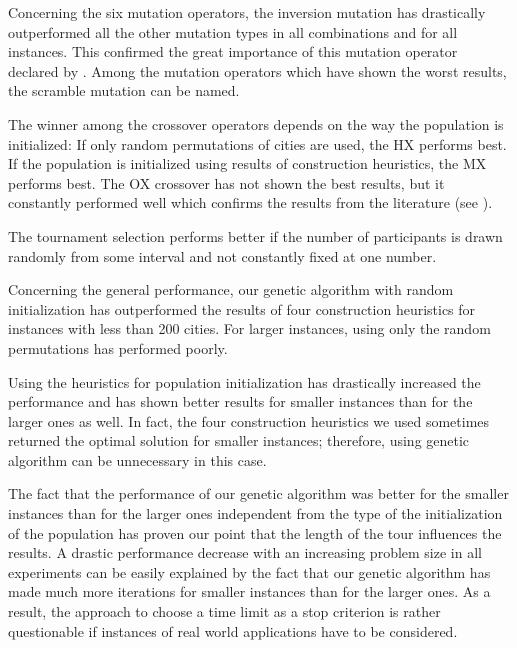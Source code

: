 Concerning the six mutation operators, the inversion mutation has drastically outperformed all the other mutation types in all combinations and for all instances. This confirmed the great importance of this mutation operator declared by \citeauthor{potvin1996genetic} \cite{potvin1996genetic}. Among the mutation operators which have shown the worst results, the scramble mutation can be named.\par 

The winner among the crossover operators depends on the way the population is initialized: If only random permutations of cities are used, the HX performs best. If the population is initialized using results of construction heuristics, the MX performs best. The OX crossover has not shown the best results, but it constantly performed well which confirms the results from the literature (see \cite{starkweather1991comparison}).\par 

The tournament selection performs better if the number of participants is drawn randomly from some interval and not constantly fixed at one number.\par 

Concerning the general performance, our genetic algorithm with random initialization has outperformed the results of four construction heuristics for instances with less than 200 cities. For larger instances, using only the random permutations has performed poorly. \par 

Using the heuristics for population initialization has drastically increased the performance and has shown better results for smaller instances than for the larger ones as well. In fact, the four construction heuristics we used sometimes returned the optimal solution for smaller instances; therefore, using genetic algorithm can be unnecessary in this case. \par 

The fact that the performance of our genetic algorithm was better for the smaller instances than for the larger ones independent from the type of the initialization of the population has proven our point that the length of the tour influences the results. A drastic performance decrease with an increasing problem size in all experiments can be easily explained by the fact that our genetic algorithm has made much more iterations for smaller instances than for the larger ones. As a result, the approach to choose a time limit as a stop criterion is rather questionable if instances of real world applications have to be considered. \par 

